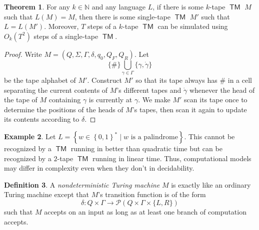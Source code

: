 \documentclass[10pt,letterpaper,cm]{nupset}
\theoremstyle{definition}
\newtheorem{definition}{Definition}[subsection]
\newtheorem{exmp}[definition]{Example}
\theoremstyle{theorem}
\newtheorem{theorem}[definition]{Theorem}
\theoremstyle{remark}
\newcommand{\N}{\mathbb N}
\renewcommand{\P}{\mathcal P}
\newcommand{\1}{\mathbf{1}}
\newcommand{\0}{\vec 0}
\DeclareMathOperator{\TM}{\mathsf{TM}}
\begin{document}
\begin{theorem}\label{equiv}
For any $k\in \N$ and any language $L$, if there is some $k$-tape $\TM$ $M$ such that $L(M) = M$, then there is some single-tape $\TM$ $M'$ such that $L = L(M')$. Moreover, $T$ steps of a $k$-tape $\TM$ can be simulated using $O_k(T^2)$ steps of a single-tape $\TM$.
\end{theorem}
\begin{proof}
Write $M= (Q, \Sigma, \Gamma, \delta, q_0, Q_F, Q_R)$. Let $$ \{\#\} \bigcup_{\gamma \in \Gamma} \{\gamma, \dot{\gamma} \}$$ be the tape alphabet of $M'$. Construct $M'$ so that its tape always has $\#$ in a cell separating  the current contents of $M$'s different tapes and $\dot{\gamma}$ whenever the head of the tape of $M$ containing $\gamma$ is currently at $\gamma$. We make $M'$ scan its tape once to determine the positions of the heads of $M$'s tapes, then scan it again to update its contents according to $\delta$.
\end{proof}

\begin{exmp}
Let $L = \left\{w \in \left\{0,1\right\}^{\ast} \mid w \text{ is a palindrome}\right\}$. This cannot be recognized by a $\TM$ running in better than quadratic time  but can be recognized by a $2$-tape $\TM$ running in linear time.  Thus, computational models may differ in complexity even when they don't in decidability.
\end{exmp}

\begin{definition}
A \textit{nondeterministic Turing machine} $M$ is exactly like an ordinary Turing machine except that $M$'s transition function is of the form $$ \delta : Q \times \Gamma \to \P(Q \times \Gamma \times \{L, R\})  $$ such that $M$ accepts on an input as long as at least one branch of computation accepts.
\end{definition}
\end{document}
